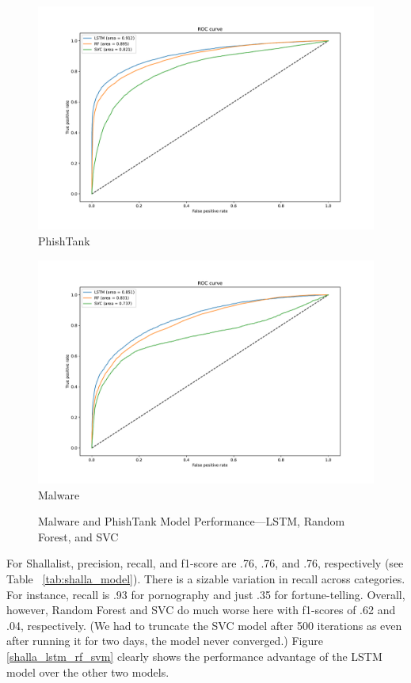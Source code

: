 \documentclass[12pt, letterpaper]{article}
\begin{document}
\begin{figure}[!htb]
\centering
\caption{Malware and PhishTank Model Performance---LSTM, Random Forest, and SVC}\label{phishtank_malware_comp}
	\begin{minipage}[b]{0.45\textwidth}
	\centering
	\label{phish_compare}
	\includegraphics[width=\textwidth]{figs/roc-phish-2017-lstm-rf-svc.pdf}\\PhishTank
	\end{minipage}
	\begin{minipage}[b]{0.45\textwidth}
	\centering
	\label{malware_compare}
	\includegraphics[width=\textwidth]{figs/roc-malware-lstm-rf-svc.pdf}\\Malware
	\end{minipage}
\end{figure}

For Shallalist, precision, recall, and f1-score are .76, .76, and .76, respectively (see Table ~\ref{tab:shalla_model}). There is a sizable variation in recall across categories. For instance, recall is .93 for pornography and just .35 for fortune-telling. Overall, however, Random Forest and SVC do much worse here with f1-scores of .62 and .04, respectively. (We had to truncate the SVC model after 500 iterations as even after running it for two days, the model never converged.) Figure \ref{shalla_lstm_rf_svm} clearly shows the performance advantage of the LSTM model over the other two models.
\end{document}
